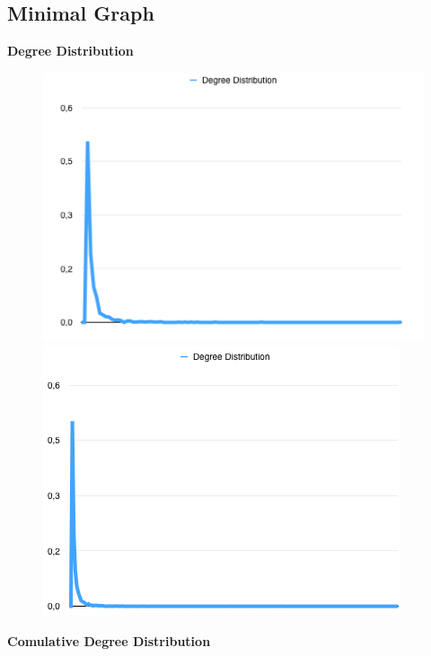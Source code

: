 \documentclass[a4paper,titlepage,11pt]{article}
\begin{document}
\subsection{Minimal Graph}
\textbf{Degree Distribution}

\begin{figure}[h]
    \centering
    \includegraphics[scale=0.50]{img/dd-minimal-3-1000.png}
    \includegraphics[scale=0.50]{img/dd-minimal-3-5000.png}
\end{figure}

\textbf{Comulative Degree Distribution}
\end{document}
